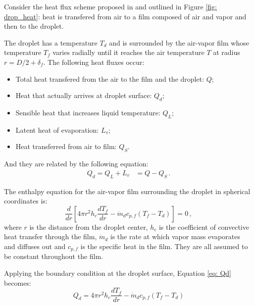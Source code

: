 Consider the heat flux scheme proposed in \cite{naca} and outlined in Figure \ref{fig: drop_heat}: heat is transfered from air to a film composed of air and vapor and then to the droplet. 

The droplet has a temperature $T_d$ and is surrounded by the air-vapor film whose temperature $T_f$ varies radially until it reaches the air temperature $T$ at radius $r=D/2+\delta_f$. The following heat fluxes occur:
\begin{itemize}
  \item Total heat transfered from the air to the film and the droplet: $Q$;
  \item Heat that actually arrives at droplet surface: $Q_d$;
  \item Sensible heat that increases liquid temperature: $Q_L$;
  \item Latent heat of evaporation: $L_v$;
  \item Heat transferred from air to film: $Q_S$.
\end{itemize}

And they are related by the following equation:
\begin{equation}
\begin{split}
  Q_d = Q_L + L_v & = Q - Q_S \, .
\end{split}  
\end{equation}

The enthalpy equation for the air-vapor film surrounding the droplet in spherical coordinates is:
\begin{equation}\label{eq: Qd}
 \frac{d}{dr}\left[ 4\pi r^2 h_c \frac{dT_f}{dr} - \dot{m}_d c_{p,f} \left(T_f -T_d\right)\right] =0 \, ,
\end{equation}
where $r$ is the distance from the droplet center, $h_c$ is the coefficient of convective heat transfer through the film, $\dot{m}_d$ is the rate at which vapor mass evaporates and diffuses out and $c_{p,f}$ is the specific heat in the film. They are all assumed to be constant throughout the film.

Applying the boundary condition at the droplet surface, Equation \eqref{eq: Qd} becomes:
\begin{equation}\label{eq: Qdbc}
 Q_d = 4\pi r^2 h_c \frac{dT_f}{dr} - \dot{m}_d c_{p,f} \left(T_f -T_d\right)
\end{equation}

